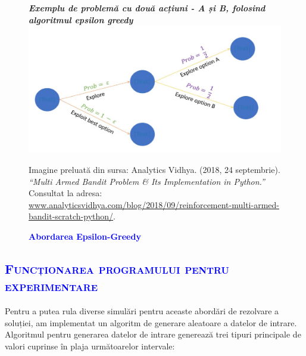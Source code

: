 \documentclass{article}
\begin{document}
\begin{figure}[h]
       \textit{\textbf{ Exemplu de problemă cu două acțiuni - A și B, folosind algoritmul epsilon greedy}}
        \centering
        \includegraphics[width=1\linewidth]{epsilon greedy approach.jpg}
        \bfseries\caption{\textbf{\textcolor{blue}{Abordarea Epsilon-Greedy}}}\vspace{15mm}
         Imagine preluată din sursa: \textnormal{Analytics Vidhya. (2018, 24 septembrie). \emph{“Multi Armed Bandit Problem \& Its Implementation in Python.”} Consultat la adresa:  {\small \url{www.analyticsvidhya.com/blog/2018/09/reinforcement-multi-armed-bandit-scratch-python/}}}. 
\end{figure}
\newpage
\begin{center}
	    \textcolor{blue}{\section{\bfseries\scshape\textcolor{blue} {Funcționarea programului pentru experimentare}}}
\end{center}
Pentru a putea rula diverse simulări pentru aceaste abordări de rezolvare a soluției, am implementat un algoritm de generare aleatoare a datelor de intrare. Algoritmul pentru generarea datelor de intrare generează trei tipuri principale de valori cuprinse în plaja următoarelor intervale:
\end{document}

